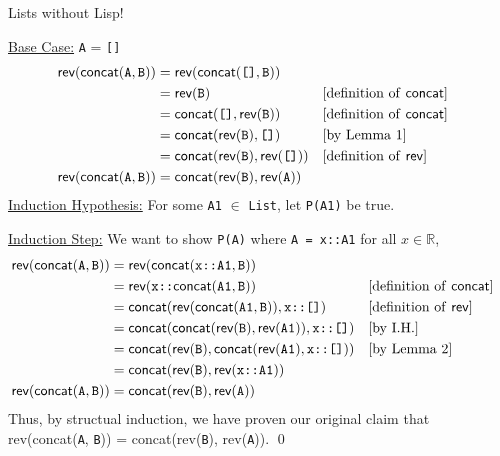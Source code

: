 \documentclass[11pt, nopagenumbers]{adamblan-hw}
\newcommand{\RR}{\mathbb{R}}
\newcommand{\fconcat}{\textsf{concat}}
\newcommand{\frev}{\textsf{rev}}
\newcommand{\emptylist}{\texttt{[]}}
\newcommand{\T}[1]{\texttt{#1}}
\newcommand{\List}{\texttt{List}}
\begin{document}
\begin{question}{\color{red} Lists without Lisp!}
\begin{part}
\underline{Base Case:} \T{A} = \emptylist
\begin{align*}
\frev(\fconcat(\T{A}, \T{B})) &= \frev(\fconcat(\emptylist, \T{B})) \\
&= \frev(\T{B}) && \text{[definition of \fconcat]}\\
&= \fconcat(\emptylist, \frev(\T{B})) && \text{[definition of \fconcat]} \\
&= \fconcat(\frev({\T{B}}), \emptylist) && \text{[by Lemma 1]} \\
&= \fconcat(\frev({\T{B}}), \frev(\emptylist)) && \text{[definition of \frev]} \\
\frev(\fconcat(\T{A}, \T{B})) &= \fconcat(\frev({\T{B}}), \frev(\T{A})) \\
\end{align*}
\underline{Induction Hypothesis:} For some \T{A1} $\in$ \List, let \T{P(A1)} be true.

\underline{Induction Step:} We want to show \T{P(A)} where \T{A = x::A1} for all $x \in \RR$,
\begin{align*}
\frev(\fconcat(\T{A}, \T{B})) &= \frev(\fconcat(\T{x::A1}, \T{B})) \\
&= \frev(\T{x::}\fconcat(\T{A1}, \T{B})) && \text{[definition of \fconcat]}\\
&= \fconcat(\frev(\fconcat(\T{A1}, \T{B})), \T{x::\emptylist}) && \text{[definition of \frev]} \\
&= \fconcat(\fconcat(\frev(\T{B}), \frev(\T{A1})), \T{x::\emptylist}) && \text{[by I.H.]} \\
&= \fconcat(\frev({\T{B}}), \fconcat(\frev(\T{A1}), \T{x::\emptylist})) && \text{[by Lemma 2]} \\
&= \fconcat(\frev(\T{B}), \frev(\T{x::A1})) \\
\frev(\fconcat(\T{A}, \T{B})) &= \fconcat(\frev({\T{B}}), \frev(\T{A})) \\
\end{align*}
Thus, by structual induction, we have proven our original claim that \\ \frev(\fconcat(\T{A}, \T{B})) = \fconcat(\frev(\T{B}), \frev(\T{A})). \qed
\end{part}
\end{question}
\end{document}
